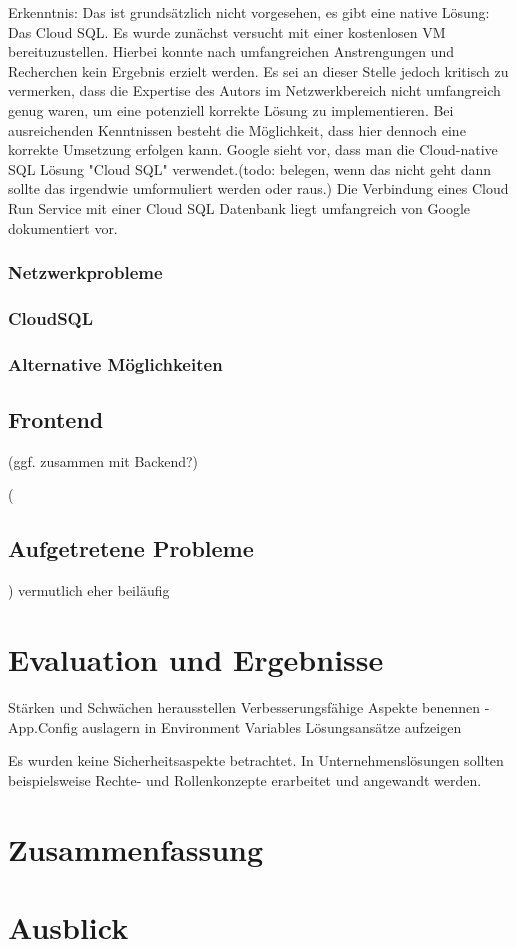 \documentclass[pdftex,a4paper,abstracton,11pt,parskip=half,bibtotocnumbered]{scrartcl}
\begin{document}
		
	
		Erkenntnis: Das ist grundsätzlich nicht vorgesehen, es gibt eine native Lösung: Das Cloud SQL. Es wurde zunächst versucht mit einer kostenlosen
		VM bereituzustellen. Hierbei konnte nach umfangreichen Anstrengungen und Recherchen kein Ergebnis erzielt werden. Es sei an dieser Stelle jedoch
		kritisch zu vermerken, dass die Expertise des Autors im Netzwerkbereich nicht umfangreich genug waren, um eine potenziell korrekte Lösung zu implementieren.
		Bei ausreichenden Kenntnissen besteht die Möglichkeit, dass hier dennoch eine korrekte Umsetzung erfolgen kann. Google sieht vor, dass man die
		Cloud-native SQL Lösung "Cloud SQL" verwendet.(todo: belegen, wenn das nicht geht dann sollte das irgendwie umformuliert werden oder raus.)
		Die Verbindung eines Cloud Run Service mit einer Cloud SQL Datenbank liegt umfangreich von Google dokumentiert vor. 

		\subsubsection{Netzwerkprobleme}
		
		\subsubsection{CloudSQL}
		
		\subsubsection{Alternative Möglichkeiten}
	\subsection{Frontend} (ggf. zusammen mit Backend?)

	(\subsection{Aufgetretene Probleme}) vermutlich eher beiläufig

\section{Evaluation und Ergebnisse}
	Stärken und Schwächen herausstellen
	Verbesserungsfähige Aspekte benennen 
		- App.Config auslagern in Environment Variables
	Lösungsansätze aufzeigen

	Es wurden keine Sicherheitsaspekte betrachtet. In Unternehmenslösungen sollten beispielsweise Rechte- und Rollenkonzepte erarbeitet und angewandt werden.
\section{Zusammenfassung}

\section{Ausblick}

%

\printbibliography
\end{document}
